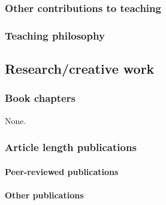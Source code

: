 \subsubsection{Other contributions to teaching}

\subsubsection{Teaching philosophy}


\subsection{Research/creative work}

\subsubsection{Book chapters}
None.

\subsubsection{Article length publications}



\paragraph{Peer-reviewed publications}

\nocite{*}
\printbibliography[keyword=OaksPeerReviewed, heading=none]

\paragraph{Other publications}


